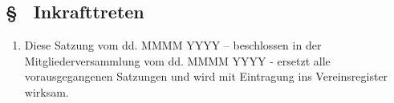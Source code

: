 \subsection{§ \thesaparagraphcounter\ Inkrafttreten} \label{sa:par:inkrafttreten}
\begin{enumerate}
    \item \label{sa:abs:d7rpvb} Diese Satzung vom dd. MMMM YYYY – beschlossen in der Mitgliederversammlung vom dd. MMMM YYYY - ersetzt alle vorausgegangenen Satzungen und wird mit Eintragung ins Vereinsregister wirksam.
\end{enumerate}